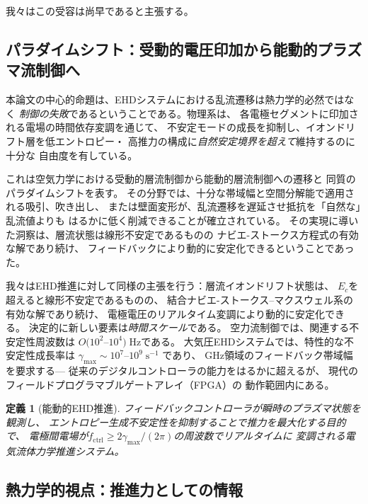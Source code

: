 \documentclass[12pt,twocolumn]{ltjsarticle}
\newtheorem{definition}{定義}
\begin{document}
我々はこの受容は尚早であると主張する。

\subsection{パラダイムシフト：受動的電圧印加から能動的プラズマ流制御へ}
\label{sec:intro:paradigm}

本論文の中心的命題は、EHDシステムにおける乱流遷移は熱力学的必然ではなく
\emph{制御の失敗}であるということである。物理系は、
各電極セグメントに印加される電場の時間依存変調を通じて、
不安定モードの成長を抑制し、イオンドリフト層を低エントロピー・
高推力の構成に\emph{自然安定境界を超えて}維持するのに十分な
自由度を有している。

これは空気力学における受動的層流制御から能動的層流制御への遷移と
同質のパラダイムシフトを表す\cite{Gad-el-Hak2000, Bewley2001}。
その分野では、十分な帯域幅と空間分解能で適用される吸引、吹き出し、
または壁面変形が、乱流遷移を遅延させ抵抗を「自然な」乱流値よりも
はるかに低く削減できることが確立されている。
その実現に導いた洞察は、層流状態は線形不安定であるものの
ナビエ-ストークス方程式の有効な解であり続け、
フィードバックにより動的に安定化できるということであった\cite{Kim2003}。

我々はEHD推進に対して同様の主張を行う：層流イオンドリフト状態は、
$E_c$を超えると線形不安定であるものの、
結合ナビエ-ストークス--マクスウェル系の有効な解であり続け、
電極電圧のリアルタイム変調により動的に安定化できる。
決定的に新しい要素は\emph{時間スケール}である。
空力流制御では、関連する不安定性周波数は
$O(10^2$--$10^4)\;\mathrm{Hz}$である。
大気圧EHDシステムでは、特性的な不安定性成長率は
$\gamma_{\max} \sim 10^7$--$10^9\;\mathrm{s}^{-1}$
\cite{Starikovskiy2013, Adamovich2017}であり、
GHz領域のフィードバック帯域幅を要求する---
従来のデジタルコントローラの能力をはるかに超えるが、
現代のフィールドプログラマブルゲートアレイ（FPGA）の
動作範囲内にある。

\begin{definition}[能動的EHD推進]
\label{def:active_ehd}
フィードバックコントローラが瞬時のプラズマ状態を観測し、
エントロピー生成不安定性を抑制することで推力を最大化する目的で、
電極間電場が$f_{\mathrm{ctrl}}
\geq 2\gamma_{\max}/(2\pi)$の周波数でリアルタイムに
変調される電気流体力学推進システム。
\end{definition}

\subsection{熱力学的視点：推進力としての情報}
\label{sec:intro:thermo}
\end{document}
